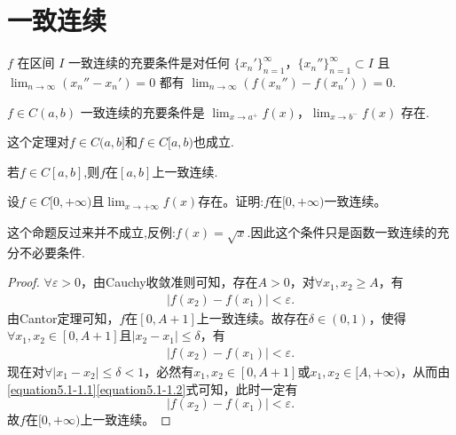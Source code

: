 \documentclass[../../main.tex]{subfiles}
\begin{document}
\section{一致连续}

\begin{theorem}\label{theorem:一致连续的充要条件1}
\(f\) 在区间 \(I\) 一致连续的充要条件是对任何 \(\{x_n'\}_{n = 1}^{\infty}\)，\(\{x_n''\}_{n = 1}^{\infty}\subset I\) 且 \(\lim_{n\rightarrow\infty}(x_n'' - x_n') = 0\) 都有 \(\lim_{n\rightarrow\infty}(f(x_n'') - f(x_n'))=0\).
\end{theorem}

\begin{theorem}[Cantor定理]\label{theorem:Cantor定理}
\(f\in C(a,b)\) 一致连续的充要条件是 \(\lim_{x\rightarrow a^{+}}f(x)\)，\(\lim_{x\rightarrow b^{-}}f(x)\) 存在.
\end{theorem}
\begin{remark}
这个定理对$f\in C(a,b]$和$f\in C[a,b)$也成立.
\end{remark}

\begin{corollary}\label{corollary:闭区间上的连续函数一定一致连续}
若$f\in C[a,b]$,则$f$在$[a,b]$上一致连续.
\end{corollary}

\begin{proposition}\label{proposition一致连续的充分不必要条件}
设\(f\in C[0,+\infty)\)且\(\lim_{x\rightarrow +\infty}f(x)\)存在。证明:\(f\)在\([0,+\infty)\)一致连续。
\end{proposition}
\begin{remark}
这个命题反过来并不成立,反例:$f(x)=\sqrt{x}$.因此这个条件只是函数一致连续的充分不必要条件.
\end{remark}
\begin{proof}
\(\forall \varepsilon > 0\)，由Cauchy收敛准则可知，存在\(A > 0\)，对\(\forall x_1, x_2 \geqslant A\)，有
\begin{align}
\left| f(x_2) - f(x_1) \right| < \varepsilon.  \label{equation5.1-1.1}
\end{align}
由Cantor定理可知，\(f\)在\([0, A + 1]\)上一致连续。故存在\(\delta \in (0, 1)\)，使得\(\forall x_1, x_2 \in [0, A + 1]\)且\(\left| x_2 - x_1 \right| \leqslant \delta\)，有
\begin{align}
\left| f(x_2) - f(x_1) \right| < \varepsilon.\label{equation5.1-1.2}
\end{align}
现在对\(\forall \left| x_1 - x_2 \right| \leqslant \delta < 1\)，必然有\(x_1, x_2 \in [0, A + 1]\)或\(x_1, x_2 \in [A, +\infty)\)，从而由\eqref{equation5.1-1.1}\eqref{equation5.1-1.2}式可知，此时一定有
\[
\left| f(x_2) - f(x_1) \right| < \varepsilon.
\]
故\(f\)在\([0, +\infty)\)上一致连续。
\end{proof}
\end{document}
